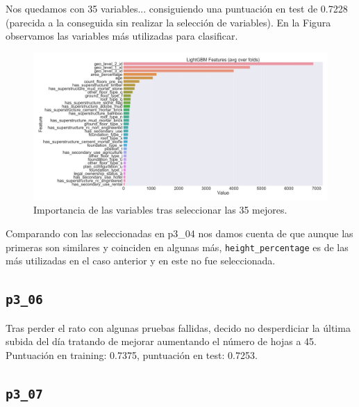 \documentclass[a4paper, 20pt]{article}
\begin{document}
Nos quedamos con 35 variables... consiguiendo una puntuación en test de 0.7228 (parecida a la conseguida sin realizar la selección de variables). En la Figura \label{fig:lgbm_imp_05_35} observamos las variables más utilizadas para clasificar.

\begin{figure}[H]
    \centering
    \includegraphics[height=0.9\textwidth, width=1.0\textwidth]{lgbm_importances_05}
    \caption{Importancia de las variables tras seleccionar las 35 mejores. }
    \label{fig:lgbm_imp_05_35}
\end{figure}

Comparando con las seleccionadas en p3\_04 nos damos cuenta de que aunque las primeras son similares y coinciden en algunas más, \texttt{height\_percentage} es de las más utilizadas en el caso anterior y en este no fue seleccionada.

\subsection{\texttt{p3\_06}}
Tras perder el rato con algunas pruebas fallidas, decido no desperdiciar la última subida del día tratando de mejorar aumentando el número de hojas a 45. Puntuación en training: 0.7375, puntuación en test: 0.7253.

\subsection{\texttt{p3\_07}}
\end{document}
